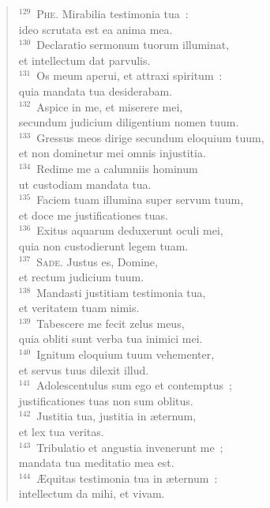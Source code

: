 \begin{flushleft}
\begin{verse}
${}^{129}$~\textsc{Phe.} Mirabilia testimonia tua~:\\ ideo scrutata est ea anima mea.\\
${}^{130}$~Declaratio sermonum tuorum illuminat,\\ et intellectum dat parvulis.\\
${}^{131}$~Os meum aperui, et attraxi spiritum~:\\ quia mandata tua desiderabam.\\
${}^{132}$~Aspice in me, et miserere mei,\\ secundum judicium diligentium nomen tuum.\\
${}^{133}$~Gressus meos dirige secundum eloquium tuum,\\ et non dominetur mei omnis injustitia.\\
${}^{134}$~Redime me a calumniis hominum\\ ut custodiam mandata tua.\\
${}^{135}$~Faciem tuam illumina super servum tuum,\\ et doce me justificationes tuas.\\
${}^{136}$~Exitus aquarum deduxerunt oculi mei,\\ quia non custodierunt legem tuam.\\
${}^{137}$~\textsc{Sade.} Justus es, Domine,\\ et rectum judicium tuum.\\
${}^{138}$~Mandasti justitiam testimonia tua,\\ et veritatem tuam nimis.\\
${}^{139}$~Tabescere me fecit zelus meus,\\ quia obliti sunt verba tua inimici mei.\\
${}^{140}$~Ignitum eloquium tuum vehementer,\\ et servus tuus dilexit illud.\\
${}^{141}$~Adolescentulus sum ego et contemptus~;\\ justificationes tuas non sum oblitus.\\
${}^{142}$~Justitia tua, justitia in \ae ternum,\\ et lex tua veritas.\\
${}^{143}$~Tribulatio et angustia invenerunt me~;\\ mandata tua meditatio mea est.\\
${}^{144}$~\AE quitas testimonia tua in \ae ternum~:\\ intellectum da mihi, et vivam.\\

\end{verse}
\end{flushleft}
